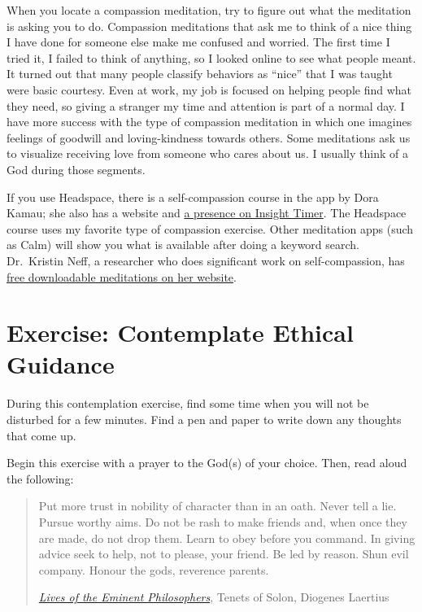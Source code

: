 \documentclass[
]{book}
\begin{document}
When you locate a compassion meditation, try to figure out what the meditation is asking you to do. Compassion meditations that ask me to think of a nice thing I have done for someone else make me confused and worried. The first time I tried it, I failed to think of anything, so I looked online to see what people meant. It turned out that many people classify behaviors as ``nice'' that I was taught were basic courtesy. Even at work, my job is focused on helping people find what they need, so giving a stranger my time and attention is part of a normal day. I have more success with the type of compassion meditation in which one imagines feelings of goodwill and loving-kindness towards others. Some meditations ask us to visualize receiving love from someone who cares about us. I usually think of a God during those segments.

If you use Headspace, there is a self-compassion course in the app by Dora Kamau; she also has a website and \href{https://insighttimer.com/dorakamau}{a presence on Insight Timer}. The Headspace course uses my favorite type of compassion exercise. Other meditation apps (such as Calm) will show you what is available after doing a keyword search. Dr.~Kristin Neff, a researcher who does significant work on self-compassion, has \href{https://self-compassion.org/guided-self-compassion-meditations-mp3-2/}{free downloadable meditations on her website}.

\hypertarget{exercise-contemplate-ethical-guidance}{%
\section{Exercise: Contemplate Ethical Guidance}\label{exercise-contemplate-ethical-guidance}}

During this contemplation exercise, find some time when you will not be disturbed for a few minutes. Find a pen and paper to write down any thoughts that come up.

Begin this exercise with a prayer to the God(s) of your choice. Then, read aloud the following:

\begin{quote}
Put more trust in nobility of character than in an oath. Never tell a lie. Pursue worthy aims. Do not be rash to make friends and, when once they are made, do not drop them. Learn to obey before you command. In giving advice seek to help, not to please, your friend. Be led by reason. Shun evil company. Honour the gods, reverence parents.

\href{https://en.wikisource.org/wiki/Lives_of_the_Eminent_Philosophers/Book_I\#Tenets_of_Solon}{\emph{Lives of the Eminent Philosophers}}, Tenets of Solon, Diogenes Laertius
\end{quote}
\end{document}
